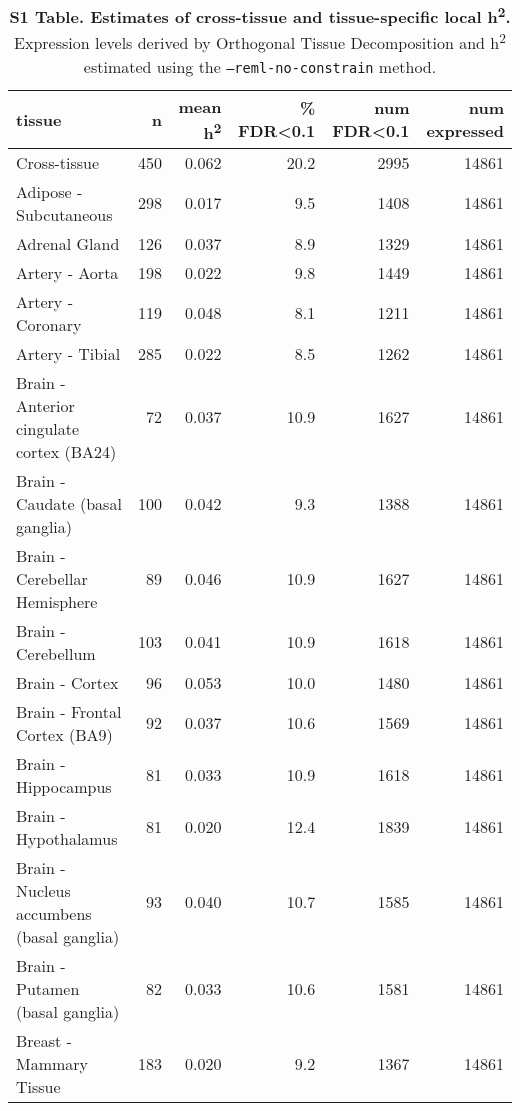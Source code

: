 \documentclass[10pt,letterpaper]{article}
\date{}
\begin{document}


\begin{table}[!ht]
\begin{adjustwidth}{-2.25in}{0in} %
\caption*{{\bf S1 Table. Estimates of cross-tissue and tissue-specific local h\textsuperscript{2}.} Expression levels derived by Orthogonal Tissue Decomposition and h\textsuperscript{2} estimated using the \texttt{--reml-no-constrain} method.}
\centering
\begin{tabular}{lrrrrr}
  \hline
tissue & n & mean h\textsuperscript{2} & \% FDR\textless{}0.1 & num FDR\textless{}0.1 & num expressed \\ 
  \hline
Cross-tissue & 450 & 0.062 & 20.2 & 2995 & 14861 \\ 
  Adipose - Subcutaneous & 298 & 0.017 & 9.5 & 1408 & 14861 \\ 
  Adrenal Gland & 126 & 0.037 & 8.9 & 1329 & 14861 \\ 
  Artery - Aorta & 198 & 0.022 & 9.8 & 1449 & 14861 \\ 
  Artery - Coronary & 119 & 0.048 & 8.1 & 1211 & 14861 \\ 
  Artery - Tibial & 285 & 0.022 & 8.5 & 1262 & 14861 \\ 
  Brain - Anterior cingulate cortex (BA24) & 72 & 0.037 & 10.9 & 1627 & 14861 \\ 
  Brain - Caudate (basal ganglia) & 100 & 0.042 & 9.3 & 1388 & 14861 \\ 
  Brain - Cerebellar Hemisphere & 89 & 0.046 & 10.9 & 1627 & 14861 \\ 
  Brain - Cerebellum & 103 & 0.041 & 10.9 & 1618 & 14861 \\ 
  Brain - Cortex & 96 & 0.053 & 10.0 & 1480 & 14861 \\ 
  Brain - Frontal Cortex (BA9) & 92 & 0.037 & 10.6 & 1569 & 14861 \\ 
  Brain - Hippocampus & 81 & 0.033 & 10.9 & 1618 & 14861 \\ 
  Brain - Hypothalamus & 81 & 0.020 & 12.4 & 1839 & 14861 \\ 
  Brain - Nucleus accumbens (basal ganglia) & 93 & 0.040 & 10.7 & 1585 & 14861 \\ 
  Brain - Putamen (basal ganglia) & 82 & 0.033 & 10.6 & 1581 & 14861 \\ 
  Breast - Mammary Tissue & 183 & 0.020 & 9.2 & 1367 & 14861 \\ 

\end{tabular}
\end{adjustwidth}
\end{table}
\end{document}
